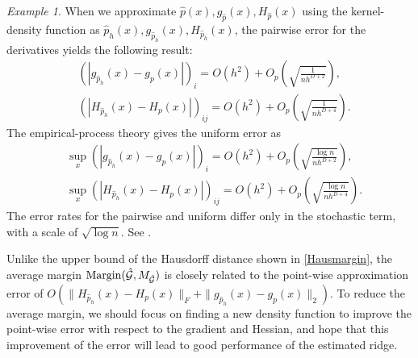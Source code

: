 \documentclass[aos,preprint]{imsart}
\theoremstyle{remark}
\newtheorem*{example}{Example}
\begin{document}
\begin{example}
When we approximate $\hat{p}(x), g_{\hat{p}}(x), H_{\hat{p}}(x)$ using the kernel-density function as $\hat{p}_h(x), g_{\hat{p}_h}(x), H_{\hat{p}_h}(x)$, %
the pairwise error for the derivatives yields the following result:
\[
\begin{aligned}
& ( |g_{\hat{p}_h}(x)-g_p(x)|)_i = O(h^2) + O_p(\sqrt{\frac{1}{{{n h^{D+2}}}}}),\\
& ( |H_{\hat{p}_h}(x)-H_p(x)| )_{ij} = O(h^2) + O_p(\sqrt{\frac{1}{{{n h^{D+4}}}}}).
\end{aligned}
\]
The empirical-process theory gives the uniform error as
\[
\begin{aligned}
& \sup_x( |g_{\hat{p}_h}(x)-g_p(x)|)_i = O(h^2) + O_p(\sqrt{\frac{\log n}{{{n h^{D+2}}}}}),\\
& \sup_x( |H_{\hat{p}_h}(x)-H_p(x)| )_{ij} = O(h^2) + O_p(\sqrt{\frac{\log n}{{{n h^{D+4}}}}}).
\end{aligned}
\]
The error rates for the pairwise and uniform differ only in the stochastic term, with a scale of $\sqrt{\log n}$. See \cite{chen2017tutorial,JMLR:v17:ariascastro16a, genovese2014nonparametric}.
\end{example}

Unlike the upper bound of the Hausdorff distance shown in \eqref{Hausmargin}, the average margin ${\rm Margin}(\hat {\mathcal G}, M_{\hat{\cal G}})$ is closely related to the point-wise approximation error of $O (\|H_{\hat{p}_h}(x)-H_p(x)\|_F+\|g_{\hat{p}_h}(x)-g_p(x)\|_2)$. To reduce the average margin, we should focus on finding a new density function to improve the point-wise error with respect to the gradient and Hessian, and hope that this improvement of the error will lead to good performance of the estimated ridge.
\end{document}
